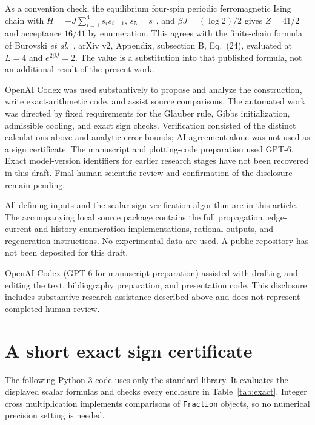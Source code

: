 \documentclass[aps,pre,reprint,longbibliography,nofootinbib,floatfix]{revtex4-2}
\begin{document}
As a convention check, the equilibrium four-spin periodic ferromagnetic
Ising chain with $H=-J\sum_{i=1}^4s_i s_{i+1}$, $s_5=s_1$, and
$\beta J=(\log2)/2$ gives $Z=41/2$ and acceptance $16/41$ by enumeration.
This agrees with the finite-chain formula of Burovski
\textit{et al.}~\cite{Burovski}, arXiv v2, Appendix, subsection B, Eq.~(24), evaluated
at $L=4$ and $e^{2\beta J}=2$. The value is a substitution into that
published formula, not an additional result of the present work.

OpenAI Codex was used substantively to propose and analyze the construction,
write exact-arithmetic code, and assist source comparisons. The automated
work was directed by fixed requirements for the Glauber rule, Gibbs
initialization, admissible cooling, and exact sign checks. Verification
consisted of the distinct calculations above and analytic error bounds;
AI agreement alone was not used as a sign certificate. The manuscript and
plotting-code preparation used GPT-6. Exact model-version identifiers for
earlier research stages have not been recovered in this draft. Final human
scientific review and confirmation of the disclosure remain pending.

All defining inputs and the scalar sign-verification algorithm are in this
article. The accompanying local source package contains the full propagation,
edge-current and history-enumeration implementations, rational outputs, and
regeneration instructions. No experimental data are used. A public repository
has not been deposited for this draft.

\begin{acknowledgments}
OpenAI Codex (GPT-6 for manuscript preparation) assisted with drafting and
editing the text, bibliography preparation, and presentation code. This
disclosure includes substantive research assistance described above and
does not represent completed human review.
\end{acknowledgments}

\appendix
\section{A short exact sign certificate}
\label{app:certificate}
The following Python 3 code uses only the standard library. It evaluates
the displayed scalar formulas and checks every enclosure in
Table~\ref{tab:exact}. Integer cross multiplication implements comparisons
of \texttt{Fraction} objects, so no numerical precision setting is needed.
\begingroup\footnotesize
{}
\endgroup


\end{document}
